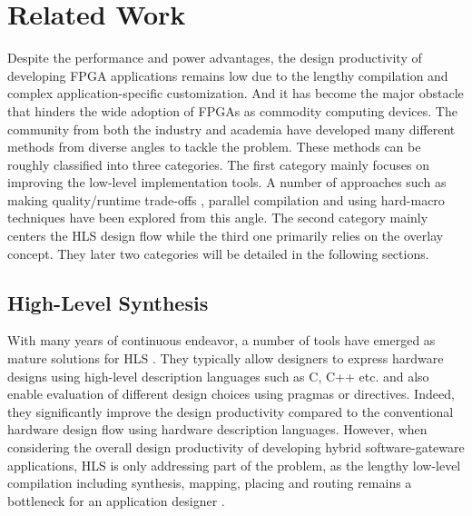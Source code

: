 \section{Related Work} \label{sec:relatedwork}
Despite the performance and power advantages, the design 
productivity of developing FPGA applications remains low 
due to the lengthy compilation and complex application-specific 
customization. And it has become the major obstacle 
that hinders the wide adoption of FPGAs as commodity computing devices. 
The community from both the industry and academia have developed 
many different methods from diverse angles to tackle the problem. 
These methods can be roughly classified into three categories. 
The first category mainly focuses on improving the low-level 
implementation tools. A number of approaches such as making 
quality/runtime trade-offs \cite{mulpuri2001runtime}, parallel 
compilation \cite{moctar2014parallel,goeders2011deterministic,altera-pc,xilinx-pc} 
and using hard-macro techniques \cite{lavin2013improving,korf2011automatic} have been explored from this angle. The second 
category mainly centers the HLS design flow while the third one 
primarily relies on the overlay concept. They later two categories 
will be detailed in the following sections.

\subsection{High-Level Synthesis} 
With many years of continuous endeavor, a number of tools have emerged as 
mature solutions for HLS \cite{VivadoHLS,Legup,zhang2008autopilot}. They typically 
allow designers to express hardware designs using high-level  
description languages such as C, C++ etc. and also enable evaluation of different 
design choices using pragmas or directives. Indeed, they significantly improve 
the design productivity compared to the conventional hardware design flow using 
hardware description languages. However, when considering the overall design 
productivity of developing hybrid software-gateware applications, HLS is 
only addressing part of the problem, as the lengthy low-level compilation 
including synthesis, mapping, placing and routing remains a bottleneck for 
an application designer \cite{ROB2014,capalija2014tile}.

